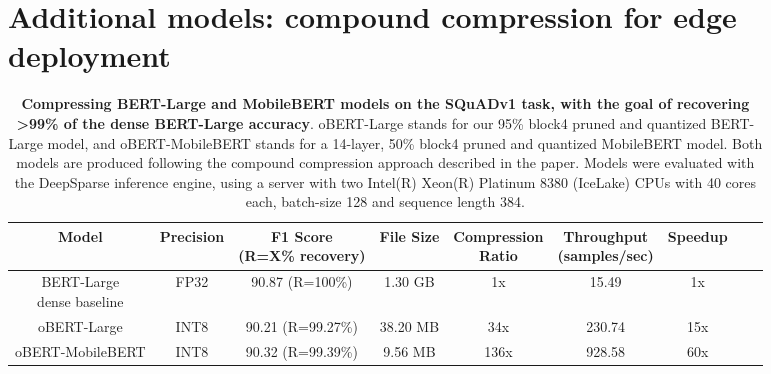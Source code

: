 \documentclass[11pt]{article}
\begin{document}
\section{Additional models: compound compression for edge deployment}
\begin{table}[h!]
    \caption{\textbf{Compressing {BERT-Large} and \textbf{MobileBERT} models on the SQuADv1 task, with the goal of recovering >99\% of the dense BERT-Large accuracy}. oBERT-Large stands for our 95\% block4 pruned and quantized BERT-Large model, and oBERT-MobileBERT stands for a 14-layer, 50\% block4 pruned and quantized MobileBERT model. Both models are produced following the compound compression approach described in the paper. Models were evaluated with the DeepSparse inference engine, using a server with two Intel(R) Xeon(R) Platinum 8380 (IceLake) CPUs with 40 cores each, batch-size 128 and sequence length 384.}
    \centering
    {\small
    \begin{tabular}{ccccccccc}
    \toprule 
    Model & Precision & \makecell{F1 Score\\(R=X\% recovery)} & File Size & \makecell{Compression\\Ratio} & \makecell{Throughput\\(samples/sec)} & Speedup \\
    \midrule
    \makecell{BERT-Large\\dense baseline} & FP32 & 90.87 (R=100\%) & 1.30 GB & 1x & 15.49 & 1x \\
    \midrule
    oBERT-Large & INT8 & 90.21 (R=99.27\%) & 38.20 MB & \phantom{1}34x & 230.74 & 15x \\
    oBERT-MobileBERT & INT8 & 90.32 (R=99.39\%) & \phantom{1}9.56 MB & 136x & 928.58 & 60x \\
    \bottomrule
    \end{tabular}
    }
\end{table}
\end{document}
